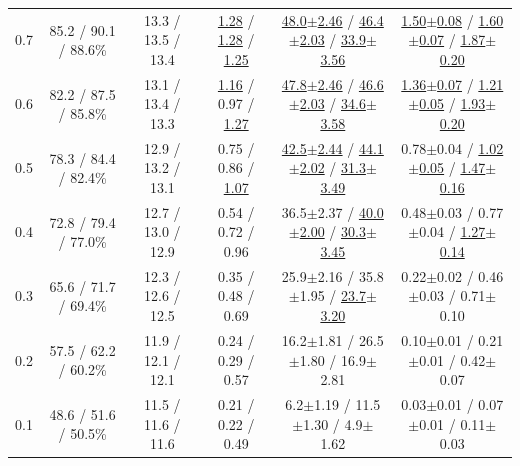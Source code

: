 \begin{table}[!t]
\begin{tabular}{c c c c c c}
0.7 & 85.2 / 90.1 / 88.6\% & 13.3 / 13.5 / 13.4 & \underline{1.28} / \underline{1.28} / \underline{1.25} & \underline{48.0{\scriptsize$\pm$2.46}} / \underline{46.4{\scriptsize$\pm$2.03}} / \underline{33.9{\scriptsize$\pm$3.56}} & \underline{1.50{\scriptsize$\pm$0.08}} / \underline{1.60{\scriptsize$\pm$0.07}} / \underline{1.87{\scriptsize$\pm$0.20}} \\
0.6 & 82.2 / 87.5 / 85.8\% & 13.1 / 13.4 / 13.3 & \underline{1.16} / 0.97 / \underline{1.27} & \underline{47.8{\scriptsize$\pm$2.46}} / \underline{46.6{\scriptsize$\pm$2.03}} / \underline{34.6{\scriptsize$\pm$3.58}} & \underline{1.36{\scriptsize$\pm$0.07}} / \underline{1.21{\scriptsize$\pm$0.05}} / \underline{1.93{\scriptsize$\pm$0.20}} \\
0.5 & 78.3 / 84.4 / 82.4\% & 12.9 / 13.2 / 13.1 & 0.75 / 0.86 / \underline{1.07} & \underline{42.5{\scriptsize$\pm$2.44}} / \underline{44.1{\scriptsize$\pm$2.02}} / \underline{31.3{\scriptsize$\pm$3.49}} & 0.78{\scriptsize$\pm$0.04} / \underline{1.02{\scriptsize$\pm$0.05}} / \underline{1.47{\scriptsize$\pm$0.16}} \\
0.4 & 72.8 / 79.4 / 77.0\% & 12.7 / 13.0 / 12.9 & 0.54 / 0.72 / 0.96 & 36.5{\scriptsize$\pm$2.37} / \underline{40.0{\scriptsize$\pm$2.00}} / \underline{30.3{\scriptsize$\pm$3.45}} & 0.48{\scriptsize$\pm$0.03} / 0.77{\scriptsize$\pm$0.04} / \underline{1.27{\scriptsize$\pm$0.14}} \\
0.3 & 65.6 / 71.7 / 69.4\% & 12.3 / 12.6 / 12.5 & 0.35 / 0.48 / 0.69 & 25.9{\scriptsize$\pm$2.16} / 35.8{\scriptsize$\pm$1.95} / \underline{23.7{\scriptsize$\pm$3.20}} & 0.22{\scriptsize$\pm$0.02} / 0.46{\scriptsize$\pm$0.03} / 0.71{\scriptsize$\pm$0.10} \\
0.2 & 57.5 / 62.2 / 60.2\% & 11.9 / 12.1 / 12.1 & 0.24 / 0.29 / 0.57 & 16.2{\scriptsize$\pm$1.81} / 26.5{\scriptsize$\pm$1.80} / 16.9{\scriptsize$\pm$2.81} & 0.10{\scriptsize$\pm$0.01} / 0.21{\scriptsize$\pm$0.01} / 0.42{\scriptsize$\pm$0.07} \\
0.1 & 48.6 / 51.6 / 50.5\% & 11.5 / 11.6 / 11.6 & 0.21 / 0.22 / 0.49 & 6.2{\scriptsize$\pm$1.19} / 11.5{\scriptsize$\pm$1.30} / 4.9{\scriptsize$\pm$1.62} & 0.03{\scriptsize$\pm$0.01} / 0.07{\scriptsize$\pm$0.01} / 0.11{\scriptsize$\pm$0.03} \\
\bottomrule
\end{tabular}
\vspace{-2mm}
\label{tab:efficiency_combined}
\end{table}

